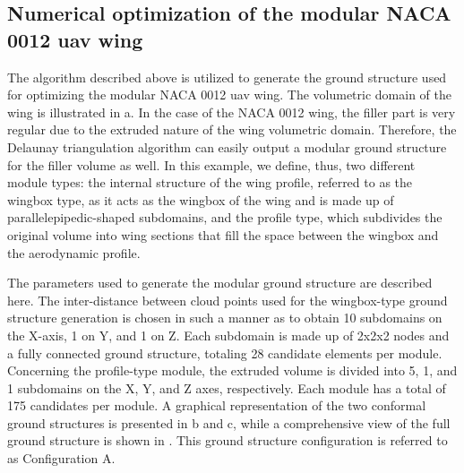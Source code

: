 \subsection{Numerical optimization of the modular NACA 0012 \gls{uav} wing}
The algorithm described above is utilized to generate the ground structure used for optimizing the modular NACA 0012 \gls{uav} wing. The volumetric domain of the wing is illustrated in a. In the case of the NACA 0012 wing, the filler part is very regular due to the extruded nature of the wing volumetric domain. Therefore, the Delaunay triangulation algorithm can easily output a modular ground structure for the filler volume as well. In this example, we define, thus, two different module types: the internal structure of the wing profile, referred to as the wingbox type, as it acts as the wingbox of the wing and is made up of parallelepipedic-shaped subdomains, and the profile type, which subdivides the original volume into wing sections that fill the space between the wingbox and the aerodynamic profile.

The parameters used to generate the modular ground structure are described here. The inter-distance between cloud points used for the wingbox-type ground structure generation is chosen in such a manner as to obtain 10 subdomains on the X-axis, 1 on Y, and 1 on Z. Each subdomain is made up of 2x2x2 nodes and a fully connected ground structure, totaling 28 candidate elements per module. Concerning the profile-type module, the extruded volume is divided into 5, 1, and 1 subdomains on the X, Y, and Z axes, respectively. Each module has a total of 175 candidates per module. A graphical representation of the two conformal ground structures is presented in b and c, while a comprehensive view of the full ground structure is shown in . This ground structure configuration is referred to as Configuration A.

